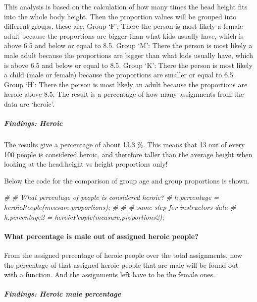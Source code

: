 \documentclass[]{article}
\newenvironment{Shaded}{\begin{snugshade}}{\end{snugshade}}
\newcommand{\CommentTok}[1]{\textcolor[rgb]{0.56,0.35,0.01}{\textit{#1}}}
\begin{document}
This analysis is based on the calculation of how many times the head
height fits into the whole body height. Then the proportion values will
be grouped into different groups, these are: Group `F': There the person
is most likely a female adult because the proportions are bigger than
what kids usually have, which is above 6.5 and below or equal to 8.5.
Group `M': There the person is most likely a male adult because the
proportions are bigger than what kids usually have, which is above 6.5
and below or equal to 8.5. Group `K': There the person is most likely a
child (male or female) because the proportions are smaller or equal to
6.5. Group `H': There the person is most likely an adult because the
proportions are heroic above 8.5. The result is a percentage of how many
assignments from the data are `heroic'.

\subparagraph{Findings: Heroic}
\label{sec:appendix-findings-heroic}

The results give a percentage of about 13.3 \%. This means that 13 out
of every 100 people is considered heroic, and therefore taller than the
average height when looking at the head.height vs height proportions
only!

Below the code for the comparison of group age and group proportions is
shown.

\begin{Shaded}
\begin{Highlighting}[]
\CommentTok{\# \# What percentage of people is considered heroic?}
\CommentTok{\# h.percentage = heroicPeople(measure.proportions);}
\CommentTok{\# }
\CommentTok{\# \# same step for instructors data}
\CommentTok{\# h.percentage2 = heroicPeople(measure.proportions2);}
\end{Highlighting}
\end{Shaded}

\newpage

\paragraph{What percentage is male out of assigned heroic people?}
\label{sec:appendix-heroic-proportions-percentage}

From the assigned percentage of heroic people over the total
assignments, now the percentage of that assigned heroic people that are
male will be found out with a function. And the assignments left have to
be the female ones.

\subparagraph{Findings: Heroic male percentage}
\label{sec:appendix-findings-heroic-male-percentage}
\end{document}
